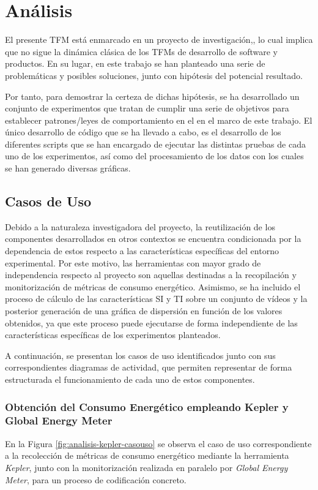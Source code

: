 \section{Análisis}
 El presente TFM está enmarcado en un proyecto de investigación,, lo cual implica que no sigue la dinámica clásica de los TFMs de desarrollo de software y productos. En su lugar, en este trabajo se han planteado una serie de problemáticas y posibles soluciones, junto con hipótesis del potencial resultado.

 Por tanto, para demostrar la certeza de dichas hipótesis, se ha desarrollado un conjunto de experimentos que tratan de cumplir una serie de objetivos para establecer patrones/leyes de comportamiento en el en el marco de este trabajo. El único desarrollo de código que se ha llevado a cabo, es el desarrollo de los diferentes scripts que se han encargado de ejecutar las distintas pruebas de cada uno de los experimentos, así como del procesamiento de los datos con los cuales se han generado diversas gráficas.
 
 \subsection{Casos de Uso}
 Debido a la naturaleza investigadora del proyecto, la reutilización de los componentes desarrollados en otros contextos se encuentra condicionada por la dependencia de estos respecto a las características específicas del entorno experimental. Por este motivo, las herramientas con mayor grado de independencia respecto al proyecto son aquellas destinadas a la recopilación y monitorización de métricas de consumo energético. Asimismo, se ha incluido el proceso de cálculo de las características SI y TI sobre un conjunto de vídeos y la posterior generación de una gráfica de dispersión en función de los valores obtenidos, ya que este proceso puede ejecutarse de forma independiente de las características específicas de los experimentos planteados.
 
 A continuación, se presentan los casos de uso identificados junto con sus correspondientes diagramas de actividad, que permiten representar de forma estructurada el funcionamiento de cada uno de estos componentes. 
 
 \subsubsection*{Obtención del Consumo Energético empleando Kepler y Global Energy Meter}
 En la Figura \ref{fig:analisis-kepler-casouso} se observa el caso de uso correspondiente a la recolección de métricas de consumo energético mediante la herramienta \textit{Kepler}, junto con la monitorización realizada en paralelo por \textit{Global Energy Meter}, para un proceso de codificación concreto.
 
